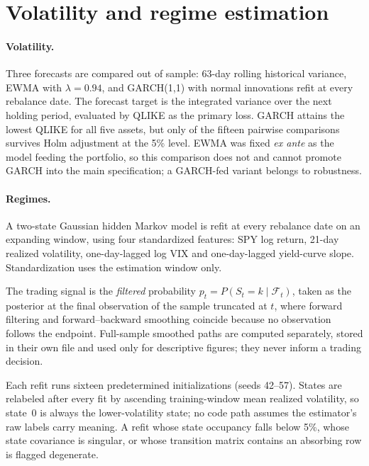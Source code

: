 \documentclass[11pt,letterpaper]{article}
\begin{document}
\section{Volatility and regime estimation}
\label{sec:estimation}

\paragraph{Volatility.} Three forecasts are compared out of sample:
63-day rolling historical variance, EWMA with $\lambda = 0.94$, and
GARCH(1,1) with normal innovations refit at every rebalance date. The
forecast target is the integrated variance over the next holding period,
evaluated by QLIKE as the primary loss. GARCH attains the lowest QLIKE
for all five assets, but only \nForecastPairsSurvivingHolm{} of the
fifteen pairwise comparisons survives Holm adjustment at the 5\%
level. EWMA was fixed
\emph{ex ante} as the model feeding the portfolio, so this comparison
does not and cannot promote GARCH into the main specification; a
GARCH-fed variant belongs to robustness.

\paragraph{Regimes.} A two-state Gaussian hidden Markov model is refit at
every rebalance date on an expanding window, using four standardized
features: SPY log return, 21-day realized volatility, one-day-lagged log
VIX and one-day-lagged yield-curve slope. Standardization uses the
estimation window only.

The trading signal is the \emph{filtered} probability
$p_t = P(S_t = k \mid \mathcal{F}_t)$, taken as the posterior at the
final observation of the sample truncated at $t$, where forward
filtering and forward--backward smoothing coincide because no
observation follows the endpoint. Full-sample smoothed paths are
computed separately, stored in their own file and used only for
descriptive figures; they never inform a trading decision.

Each refit runs sixteen predetermined initializations (seeds 42--57).
States are relabeled after every fit by ascending training-window mean
realized volatility, so state~0 is always the lower-volatility state; no
code path assumes the estimator's raw labels carry meaning. A refit
whose state occupancy falls below 5\%, whose state covariance is
singular, or whose transition matrix contains an absorbing row is
flagged degenerate.
\end{document}
